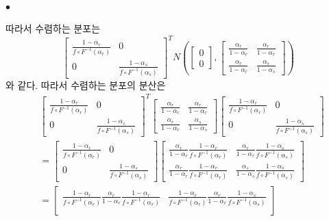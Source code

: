 \documentclass[12pt,oneside,english]{book}
\def\ck{\paragraph{\Large$\bullet$}\Large}
\begin{document}
\ck 따라서 수렴하는 분포는 
\[
\begin{bmatrix}\frac{1-\alpha_r}{f\circ F^{-1}(\alpha_r)} & 0 \\ 0 & \frac{1-\alpha_s}{f\circ F^{-1}(\alpha_s)}\end{bmatrix}^T N\left(\begin{bmatrix}0\\0\end{bmatrix},\begin{bmatrix} \frac{\alpha_r}{1-\alpha_r} & \frac{\alpha_r}{1-\alpha_r} \\ \frac{\alpha_r}{1-\alpha_r} & \frac{\alpha_s}{1-\alpha_s} \end{bmatrix}\right)
\]
와 같다. 따라서 수렴하는 분포의 분산은 
\begin{align*}
& \begin{bmatrix}\frac{1-\alpha_r}{f\circ F^{-1}(\alpha_r)} & 0 \\ 0 & \frac{1-\alpha_s}{f\circ F^{-1}(\alpha_s)}\end{bmatrix}^T 
\begin{bmatrix} \frac{\alpha_r}{1-\alpha_r} & \frac{\alpha_r}{1-\alpha_r} \\ \frac{\alpha_r}{1-\alpha_r} & \frac{\alpha_s}{1-\alpha_s} \end{bmatrix}
\begin{bmatrix}\frac{1-\alpha_r}{f\circ F^{-1}(\alpha_r)} & 0 \\ 0 & \frac{1-\alpha_s}{f\circ F^{-1}(\alpha_s)}\end{bmatrix} \\
& = \begin{bmatrix}
\frac{1-\alpha_r}{f\circ F^{-1}(\alpha_r)} & 0 \\ 0 & \frac{1-\alpha_s}{f\circ F^{-1}(\alpha_s)}
\end{bmatrix}
\begin{bmatrix}
\frac{\alpha_r}{1-\alpha_r}\frac{1-\alpha_r}{f\circ F^{-1}(\alpha_r)} & \frac{\alpha_r}{1-\alpha_r}\frac{1-\alpha_s}{f\circ F^{-1}(\alpha_s)} \\ 
\frac{\alpha_r}{1-\alpha_r}\frac{1-\alpha_r}{f\circ F^{-1}(\alpha_r)} & 
\frac{\alpha_s}{1-\alpha_s}\frac{1-\alpha_s}{f\circ F^{-1}(\alpha_s)}
\end{bmatrix} \\ 
& =
\begin{bmatrix}
\frac{1-\alpha_r}{f\circ F^{-1}(\alpha_r)}\frac{\alpha_r}{1-\alpha_r}\frac{1-\alpha_r}{f\circ F^{-1}(\alpha_r)} & \frac{1-\alpha_r}{f\circ F^{-1}(\alpha_r)}\frac{\alpha_r}{1-\alpha_r}\frac{1-\alpha_s}{f\circ F^{-1}(\alpha_s)} \\ 

\end{bmatrix}
\end{align*}
\end{document}
